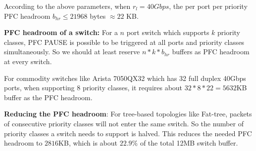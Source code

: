 {According to the above parameters, when  $r_l=40Gbps$, the per port per priority PFC headroom $b_{hr} \leq 21968$ bytes $\approx 22$ KB.

\textbf{PFC headroom of a switch:} For a $n$ port switch which supports $k$ priority classes, PFC PAUSE is possible to be triggered at all ports and priority classes simultaneously. So we should at least reserve $n*k*b_{hr}$ buffers as PFC headroom at every switch.

For commodity switches like Arista 7050QX32 which has 32 full duplex 40Gbps ports, when supporting 8 priority classes, it requires about $32*8*22=5632$KB buffer as the PFC headroom.

\textbf{Reducing the PFC headroom}: For tree-based topologies like Fat-tree, packets of consecutive priority classes will not enter the same switch. So the number of priority classes a switch needs to support is halved.  This reduces the needed PFC headroom to $2816$KB, which is about $22.9\%$ of the total 12MB switch buffer.



%
%
%

}
